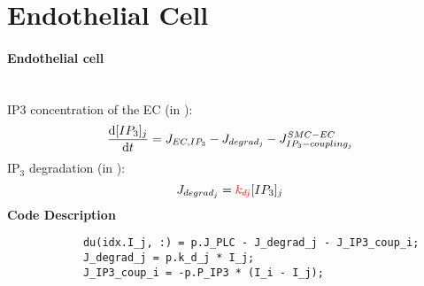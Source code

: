 \documentclass[fleqn]{report}
\numberwithin{equation}{section}
\numberwithin{equation}{section}
\begin{document}
 		\section{Endothelial Cell}
 			\paragraph{Endothelial cell}~\\
 			\gls{IP3} concentration of the \gls{EC} (in \uM):
 			\begin{equation} \label{eq:dIjdt}
 			\dfrac{\mathrm{d}[IP_{3}]_{j}}{\mathrm{d}t} =  J_{EC,IP_3}- J_{degrad_{j}}  - J^{SMC-EC}_{IP_{3}-coupling_{j}}
 			\end{equation}
 			 									IP$_{3}$ degradation (in \uMs):  
 			 			 									\begin{equation} \label{eq:Jdegradj}
 			 									 									J_{degrad_{j}}= \textcolor{red}{k_{dj}} [IP_{3}]_{j}
 										 					\end{equation}
 			\textbf{Code Description}
 			\begin{verbatim}
 			du(idx.I_j, :) = p.J_PLC - J_degrad_j - J_IP3_coup_i;
 			J_degrad_j = p.k_d_j * I_j;
 			J_IP3_coup_i = -p.P_IP3 * (I_i - I_j);
 			\end{verbatim}
\end{document}

